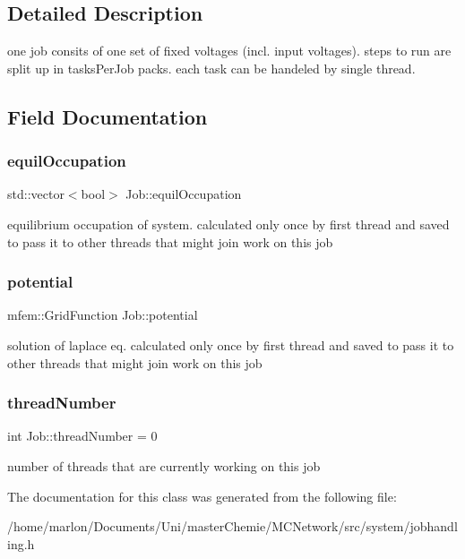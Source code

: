 \subsection{Detailed Description}
one job consits of one set of fixed voltages (incl. input voltages). steps to run are split up in tasks\+Per\+Job packs. each task can be handeled by single thread. 

\subsection{Field Documentation}
\mbox{\label{classJob_a0c4579b73aec5c6755f271d78a488ae6}} 
\subsubsection{\texorpdfstring{equil\+Occupation}{equilOccupation}}
{\footnotesize\ttfamily std\+::vector$<$bool$>$ Job\+::equil\+Occupation}

equilibrium occupation of system. calculated only once by first thread and saved to pass it to other threads that might join work on this job \mbox{\label{classJob_ad2b87bb3cea36a711bf7aace2d0cb338}} 
\subsubsection{\texorpdfstring{potential}{potential}}
{\footnotesize\ttfamily mfem\+::\+Grid\+Function Job\+::potential}

solution of laplace eq. calculated only once by first thread and saved to pass it to other threads that might join work on this job \mbox{\label{classJob_ae1cfd5a6e867f3664c8f183427a4775a}} 
\subsubsection{\texorpdfstring{thread\+Number}{threadNumber}}
{\footnotesize\ttfamily int Job\+::thread\+Number = 0}

number of threads that are currently working on this job 

The documentation for this class was generated from the following file\+:\begin{DoxyCompactItemize}
\item 
/home/marlon/\+Documents/\+Uni/master\+Chemie/\+M\+C\+Network/src/system/jobhandling.\+h\end{DoxyCompactItemize}
